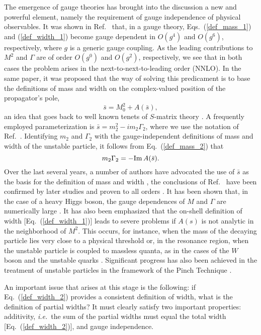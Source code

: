 \documentclass[a4paper,12pt]{article}
\begin{document}
The emergence of gauge theories has brought into the discussion a new and
powerful element, namely the requirement of gauge independence of physical
observables.
It was shown in Ref.~\cite{si_1} that, in a gauge theory,
Eqs.~(\ref{def_mass_1}) and (\ref{def_width_1}) become gauge dependent in
$O(g^4)$ and $O(g^6)$, respectively, where $g$ is a generic gauge coupling.
As the leading contributions to $M^2$ and $\Gamma$ are of order $O(g^0)$ and
$O(g^2)$, respectively, we see that in both cases the problem arises in the
next-to-next-to-leading order (NNLO).
In the same paper, it was proposed that the way of solving this predicament is
to base the definitions of mass and width on the complex-valued position of
the propagator's pole,
\begin{equation}
\label{def_mass_2}
\bar s=M^2_0+A(\bar s), 
\end{equation}
an idea that goes back to well known tenets of $S$-matrix theory
\cite{s-matrix}.
A frequently employed parameterization is $\bar s=m_2^2-im_2\Gamma_2$, where
we use the notation of Ref.~\cite{si_1}.
Identifying $m_2$ and $\Gamma_2$ with the gauge-independent definitions of
mass and width of the unstable particle, it follows from
Eq.~(\ref{def_mass_2}) that
\begin{equation}
\label{def_width_2}
m_2\Gamma_2=-{\rm Im}\,A(\bar s).  
\end{equation}
Over the last several years, a number of authors have advocated the use of
$\bar s$ as the basis for the definition of mass and width \cite{zmass}, the
conclusions of Ref.~\cite{si_1} have been confirmed by later studies
\cite{psz,si-kniehl} and proven to all orders \cite{gg}.
It has been shown that, in the case of a heavy Higgs boson, the gauge
dependences of $M$ and $\Gamma$ are numerically large \cite{si-kniehl}.
It has also been emphasized that the on-shell definition of width
[Eq.~(\ref{def_width_1})] leads to severe problems if $A(s)$ is not analytic
in the neighborhood of $M^2$.
This occurs, for instance, when the mass of the decaying particle lies very
close to a physical threshold \cite{bhatta,pal} or, in the resonance region,
when the unstable particle is coupled to massless quanta, as in the cases of
the $W$ boson and the unstable quarks \cite{psw}.
Significant progress has also been achieved in the treatment of unstable
particles in the framework of the Pinch Technique \cite{pt}.

An important issue that arises at this stage is the following:
if Eq.~(\ref{def_width_2}) provides a consistent definition of width, what is
the definition of partial widths?
It must clearly satisfy two important properties: additivity, {\it i.e.}\ the
sum of the partial widths must equal the total width
[Eq.~(\ref{def_width_2})], and gauge independence.
\end{document}
